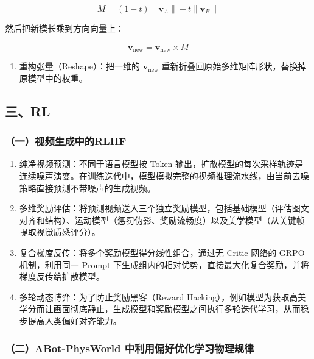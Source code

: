 \[
M=(1-t)\|\mathbf{v}_A\|+t\|\mathbf{v}_B\|
\]

然后把新模长乘到方向向量上：

\[
\mathbf{v}_{\mathrm{new}}=\hat{\mathbf{v}}_{\mathrm{new}}\times M
\]

\begin{enumerate}
\def\labelenumi{\arabic{enumi}.}
\setcounter{enumi}{7}
\tightlist
\item
  重构张量（Reshape）：把一维的 \(\mathbf{v}_{\mathrm{new}}\) 重新折叠回原始多维矩阵形状，替换掉原模型中的权重。
\end{enumerate}

\hypertarget{ux4e09rl}{%
\subsection{三、RL}\label{ux4e09rl}}

\hypertarget{ux4e00ux89c6ux9891ux751fux6210ux4e2dux7684rlhf}{%
\subsubsection{（一）视频生成中的RLHF}\label{ux4e00ux89c6ux9891ux751fux6210ux4e2dux7684rlhf}}

\begin{enumerate}
\def\labelenumi{\arabic{enumi}.}
\item
  纯净视频预测：不同于语言模型按 Token 输出，扩散模型的每次采样轨迹是连续噪声演变。在训练迭代中，模型模拟完整的视频推理流水线，由当前去噪策略直接预测不带噪声的生成视频。
\item
  多维奖励评估：将预测视频送入三个独立奖励模型，包括基础模型（评估图文对齐和结构）、运动模型（惩罚伪影、奖励流畅度）以及美学模型（从关键帧提取视觉质感评分）。
\item
  复合梯度反传：将多个奖励模型得分线性组合，通过无 Critic 网络的 GRPO 机制，利用同一 Prompt 下生成组内的相对优势，直接最大化复合奖励，并将梯度反传给扩散模型。
\item
  多轮动态博弈：为了防止奖励黑客（Reward Hacking），例如模型为获取高美学分而让画面彻底静止，生成模型和奖励模型之间执行多轮迭代学习，从而稳步提高人类偏好对齐能力。
\end{enumerate}

\hypertarget{ux4e8cabot-physworld-ux4e2dux5229ux7528ux504fux597dux4f18ux5316ux5b66ux4e60ux7269ux7406ux89c4ux5f8b}{%
\subsubsection{（二）ABot-PhysWorld 中利用偏好优化学习物理规律}\label{ux4e8cabot-physworld-ux4e2dux5229ux7528ux504fux597dux4f18ux5316ux5b66ux4e60ux7269ux7406ux89c4ux5f8b}}

